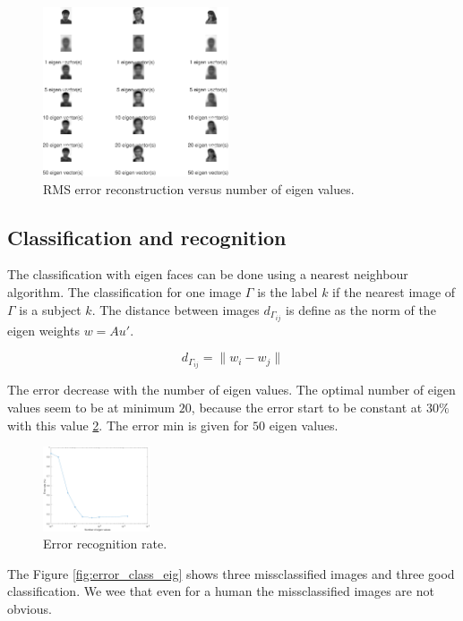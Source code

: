 \documentclass[runningheads,a4paper]{llncs}
\begin{document}
\begin{figure}
\centering
\includegraphics[height=5cm]{Figures/rec_eig_face}
\caption{RMS error reconstruction versus number of eigen values.}
\label{fig:rec_eig_face}
\end{figure}

\subsection{Classification and recognition}

The classification with eigen faces can be done using a nearest neighbour algorithm. The classification for one image $\Gamma$ is the label $k$ if the nearest image of $\Gamma$ is a subject $k$. The distance between images $d_{\Gamma_{ij}}$ is define as the norm of the eigen weights $w=Au'$.

\begin{equation}
d_{\Gamma_{ij}}=\|w_i-w_j\|
\end{equation}

The error decrease with the number of eigen values. The optimal number of eigen values seem to be at minimum $20$, because the error start to be constant at $30\%$ with this value \ref{fig:error_rate_eig}. The error min is given for $50$ eigen values.

\begin{figure}
\centering
\includegraphics[height=2.5cm]{Figures/error_rate_eig}
\caption{Error recognition rate.}
\label{fig:error_rate_eig}
\end{figure}

The Figure \ref{fig:error_class_eig} shows three missclassified images and three good classification. We wee that even for a human the missclassified images are not obvious.
\end{document}
